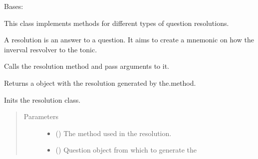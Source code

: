 \documentclass[letterpaper,10pt,english]{sphinxmanual}
\begin{document}
\begin{fulllineitems}
\label{\detokenize{birdears:birdears.resolution.Resolution}}
\sphinxAtStartPar
Bases: 

\sphinxAtStartPar
This class implements methods for different types of question
resolutions.

\sphinxAtStartPar
A resolution is an answer to a question. It aims to create a mnemonic on
how the inverval resvolver to the tonic.

\begin{fulllineitems}
\label{\detokenize{birdears:birdears.resolution.Resolution.__call__}}
\sphinxAtStartPar
Calls the resolution method and pass arguments to it.

\sphinxAtStartPar
Returns a  object with the resolution generated by
the.method.

\end{fulllineitems}


\begin{fulllineitems}
\label{\detokenize{birdears:birdears.resolution.Resolution.__init__}}
\sphinxAtStartPar
Inits the resolution class.
\begin{quote}\begin{description}
\item[{Parameters}] \leavevmode\begin{itemize}
\item {} 
\sphinxAtStartPar
{} () \textendash{} The method used in the resolution.

\item {} 
\sphinxAtStartPar
{} () \textendash{} Question object from which to generate the


\end{itemize}
\end{description}
\end{quote}
\end{fulllineitems}
\end{fulllineitems}
\end{document}
